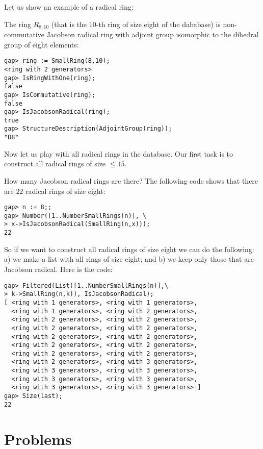 Let us show an example of a radical ring:

\begin{example}
The ring $R_{8,10}$ (that is the $10$-th ring of size eight of the dababase) is
non-commutative Jacobson radical ring with adjoint group isomorphic to the
dihedral group of eight elements: 
\begin{lstlisting}
gap> ring := SmallRing(8,10);
<ring with 2 generators>
gap> IsRingWithOne(ring);
false
gap> IsCommutative(ring);
false
gap> IsJacobsonRadical(ring);
true
gap> StructureDescription(AdjointGroup(ring));
"D8"
\end{lstlisting}
\end{example}

Now let us play with all radical rings in the database. Our first task is to
construct all radical rings of size $\leq15$. 

\begin{example}
	How many Jacobson radical rings are there? The following code shows
	that there are $22$ 
	radical rings of size eight:
\begin{lstlisting}
gap> n := 8;;
gap> Number([1..NumberSmallRings(n)], \
> x->IsJacobsonRadical(SmallRing(n,x)));
22
\end{lstlisting}
So if we want to construct all radical rings of size eight we can do the following:
a) we make a list with all rings of size eight; and b) we keep only those that are Jacobson radical. Here is the code:

\begin{lstlisting}
gap> Filtered(List([1..NumberSmallRings(n)],\
> k->SmallRing(n,k)), IsJacobsonRadical);
[ <ring with 1 generators>, <ring with 1 generators>, 
  <ring with 1 generators>, <ring with 2 generators>, 
  <ring with 2 generators>, <ring with 2 generators>, 
  <ring with 2 generators>, <ring with 2 generators>, 
  <ring with 2 generators>, <ring with 2 generators>, 
  <ring with 2 generators>, <ring with 2 generators>, 
  <ring with 2 generators>, <ring with 2 generators>, 
  <ring with 2 generators>, <ring with 3 generators>, 
  <ring with 3 generators>, <ring with 3 generators>, 
  <ring with 3 generators>, <ring with 3 generators>, 
  <ring with 3 generators>, <ring with 3 generators> ]
gap> Size(last);
22
\end{lstlisting}
\end{example}

\section{Problems}

